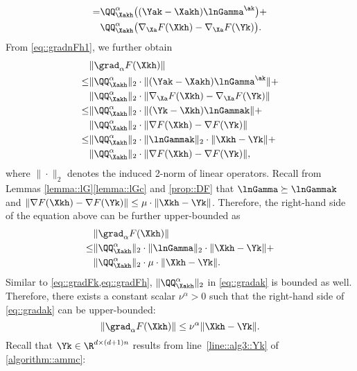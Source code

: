 \begin{enumerate}[leftmargin=0.45cm]
\begin{equation}
\begin{aligned}
		=&\QQ_{\Xakh}^\alpha\big((\Yak-\Xakh)\lnGamma^{\ak}\big)+\\
		&\QQ_{\Xakh}^\alpha\big(\nabla_{\Xa} F(\Xkh)-\nabla_{\Xa} F(\Yk)\big).
	\end{aligned}
\end{equation}
From \cref{eq::gradnFh1}, we further obtain
\begin{equation}
\nonumber
\begin{aligned}
&\|\grad_{\alpha} F(\Xkh)\|\\
\leq& \|\QQ_{\Xakh}^\alpha\|_2\cdot\|(\Yak-\Xakh)\lnGamma^{\ak}\|+\\
& \|\QQ_{\Xakh}^\alpha\|_2\cdot\|\nabla_{\Xa} F(\Xkh)-\nabla_{\Xa} F(\Yk)\|\\
\leq&\|\QQ_{\Xakh}^\alpha\|_2\cdot\|(\Yk-\Xkh)\lnGammak\|+\\
&\|\QQ_{\Xakh}^\alpha\|_2\cdot\|\nabla F(\Xkh)-\nabla F(\Yk)\|\\
\leq&\|\QQ_{\Xakh}^\alpha\|_2\cdot\|\lnGammak\|_2\cdot\|\Xkh-\Yk\|+\\
&\|\QQ_{\Xakh}^\alpha\|_2\cdot\|\nabla F(\Xkh)-\nabla F(\Yk)\|,
\end{aligned}
\end{equation}
where $\|\cdot\|_2$ denotes the induced 2-norm of linear operators. Recall from Lemmas \ref{lemma::lG}\ref{lemma::lGc} and \ref{prop::DF} that $\lnGamma\succeq\lnGammak$ and $\|\nabla F(\Xkh)-\nabla F(\Yk)\|\leq \mu\cdot\|\Xkh-\Yk\|$. Therefore, the right-hand side of the equation above can be further upper-bounded as
\begin{equation}\label{eq::gradak}
\begin{aligned}
	&\|\grad_\alpha F(\Xkh)\|\\
\leq&\|\QQ_{\Xakh}^\alpha\|_2\cdot \|\lnGamma\|_2\cdot\|\Xkh-\Yk\|+\\
	&\|\QQ_{\Xakh}^\alpha\|_2\cdot\mu\cdot\|\Xkh-\Yk\|.
\end{aligned}
\end{equation}
Similar to \cref{eq::gradFk,eq::gradFh}, $\|\QQ_{\Xakh}^\alpha\|_2$ in \cref{eq::gradak} is bounded as well. Therefore, there exists a constant scalar $\nu^\alpha >0$ such that the right-hand side of \cref{eq::gradak} can be upper-bounded:
\begin{equation}\label{eq::gradFa1}
	\|\grad_{\alpha} F(\Xkh)\|\leq \nu^\alpha \|\Xkh-\Yk\|.
\end{equation}
Recall that $\Yk\in\R^{d\times(d+1)n}$ results from line~\ref{line::alg3::Yk} of \cref{algorithm::ammc}:
\begin{equation}\label{eq::Y}

\end{equation}
\end{enumerate}
